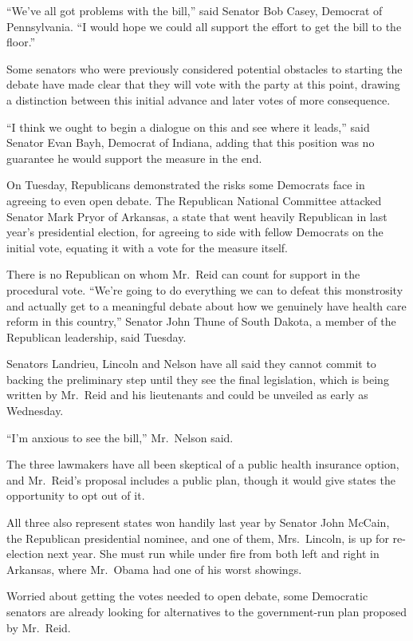 ﻿\documentclass[12pt]{article}
\begin{document}
``We've all got problems with the bill,'' said Senator Bob Casey, Democrat of Pennsylvania. ``I
would hope we could all support the effort to get the bill to the floor.''

Some senators who were previously considered potential obstacles to starting the debate have made
clear that they will vote with the party at this point, drawing a distinction between this initial
advance and later votes of more consequence.

``I think we ought to begin a dialogue on this and see where it leads,'' said Senator Evan Bayh,
Democrat of Indiana, adding that this position was no guarantee he would support the measure in the
end.

On Tuesday, Republicans demonstrated the risks some Democrats face in agreeing to even open debate.
The Republican National Committee attacked Senator Mark Pryor of Arkansas, a state that went heavily
Republican in last year's presidential election, for agreeing to side with fellow Democrats on the
initial vote, equating it with a vote for the measure itself.

There is no Republican on whom Mr.~Reid can count for support in the procedural vote. ``We're going
to do everything we can to defeat this monstrosity and actually get to a meaningful debate about how
we genuinely have health care reform in this country,'' Senator John Thune of South Dakota, a member
of the Republican leadership, said Tuesday.

Senators Landrieu, Lincoln and Nelson have all said they cannot commit to backing the preliminary
step until they see the final legislation, which is being written by Mr.~Reid and his lieutenants
and could be unveiled as early as Wednesday.

``I'm anxious to see the bill,'' Mr.~Nelson said.

The three lawmakers have all been skeptical of a public health insurance option, and Mr.~Reid's
proposal includes a public plan, though it would give states the opportunity to opt out of it.

All three also represent states won handily last year by Senator John McCain, the Republican
presidential nominee, and one of them, Mrs.~Lincoln, is up for re-election next year. She must run
while under fire from both left and right in Arkansas, where Mr.~Obama had one of his worst
showings.

Worried about getting the votes needed to open debate, some Democratic senators are already looking
for alternatives to the government-run plan proposed by Mr.~Reid.
\end{document}
